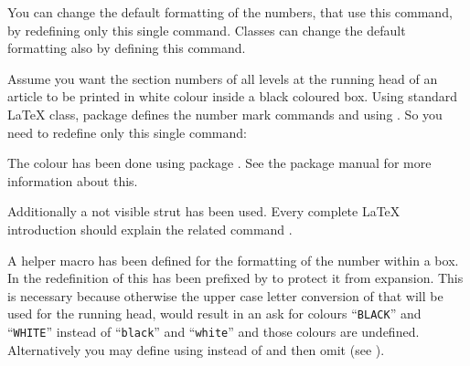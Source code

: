   You can change the default formatting of the numbers, that use this command,
  by redefining only this single command. Classes can change the default
  formatting also by defining this command.%
    \begin{Example}
      \label{xmpl:\ThisCommonLabelBase.cmd.GenericMarkFormat}%
      Assume you want the section numbers of all levels at the running head of
      an article to be printed in white colour inside a black coloured
      box. Using standard \LaTeX{}  class, package
       defines the number mark commands
       and  using
      . So you need to redefine only this single
      command:
      The colour has been done using package
      . See the package manual for more
      information about this. 

      Additionally a not visible strut has been used. Every complete \LaTeX{}
      introduction should explain the related command .

      A helper macro  has been defined for the formatting of
      the number within a box. In the redefinition of
       this has been prefixed by  to
      protect it from expansion. This is necessary because otherwise the upper
      case letter conversion of  that will be used for
      the running head, would result in an ask for colours ``\texttt{BLACK}''
      and ``\texttt{WHITE}'' instead of ``\texttt{black}'' and
      ``\texttt{white}'' and those colours are undefined. Alternatively you
      may define  using  instead
      of  and then omit  (see
      \cite{latex:clsguide}).


\end{Example}
